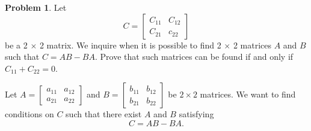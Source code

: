 \documentclass[12pt]{article}
\theoremstyle{definition}
\newtheorem{problem}{Problem}
\begin{document}
\begin{problem}
    Let
    \[
    C =
    \begin{bmatrix}
        C_{11} & C_{12}\\
        C_{21} & c_{22} 
    \end{bmatrix}
    \]
    be a 2 $\times$ 2 matrix. We inquire when it is possible to find 2 $\times$ 2 matrices $A$ and $B$ such that $C = AB - BA$. Prove that such matrices can be found if and only if $C_{11} + C_{22} = 0$.
    
    \begin{solution}


        Let \( A = \begin{bmatrix} a_{11} & a_{12} \\ a_{21} & a_{22} \end{bmatrix} \) and \( B = \begin{bmatrix} b_{11} & b_{12} \\ b_{21} & b_{22} \end{bmatrix} \) be \( 2 \times 2 \) matrices. We want to find conditions on \(C\) such that there exist \(A\) and \(B\) satisfying
    \[    C = AB - BA.    \]
    

\end{solution}
\end{problem}
\end{document}
